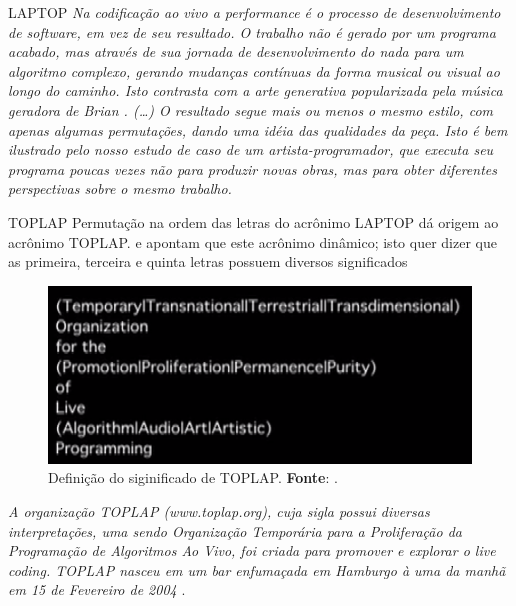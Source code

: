 \documentclass[aspectratio=169]{beamer}
\begin{document}
\begin{frame}{LAPTOP}
\emph{Na codificação ao vivo a performance é o processo de desenvolvimento de \emph{software}, em vez de seu resultado. O trabalho não é gerado por um programa acabado, mas através de sua jornada de desenvolvimento do nada para um algoritmo complexo, gerando mudanças contínuas da forma musical ou visual ao longo do caminho. Isto contrasta com a arte generativa popularizada pela música geradora de Brian . (\ldots) O resultado segue mais ou menos o mesmo estilo, com apenas algumas permutações, dando uma idéia das qualidades da peça. Isto é bem ilustrado pelo nosso estudo de caso de um artista-programador, que executa seu programa poucas vezes não para produzir novas obras, mas para obter diferentes perspectivas sobre o mesmo trabalho.}
\end{frame}


\begin{frame}[allowframebreaks]{TOPLAP}
Permutação na ordem das letras do acrônimo LAPTOP dá origem ao acrônimo TOPLAP.  e  apontam que este acrônimo dinâmico; isto quer dizer que as primeira, terceira  e quinta letras possuem diversos significados

\begin{figure}[!h]
  \centering
  \includegraphics[scale=0.6]{imagens/TOPLAP.png}
  \caption{Definição do siginificado de TOPLAP. \textbf{Fonte}: .}
  \label{fig:TOPLAP}
\end{figure}

\emph{A organização TOPLAP (www.toplap.org), cuja sigla possui diversas interpretações, uma sendo \emph{Organização Temporária para a Proliferação da Programação de Algoritmos Ao Vivo}, foi criada para promover e explorar o \emph{live coding}. TOPLAP nasceu em um bar enfumaçada em Hamburgo à uma da manhã em 15 de Fevereiro de 2004} \cite[p.~246]{ward_live_2004}.

\end{frame}
\end{document}
